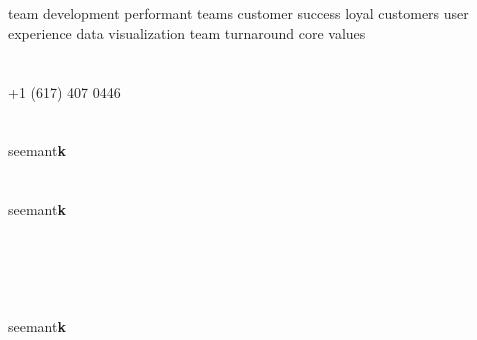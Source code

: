 \documentclass[]{friggeri-cv} %
\newcommand{\rotxc}[1]{\begin{sideways}#1\end{sideways}}
\newcommand{\invert}[1]{\rotxc{\rotxc{#1}}}
\begin{document}
\begin{aside} %
\section{{\scriptsize {}}}
team development
performant teams
customer success
loyal customers
user experience
data visualization
team turnaround
core values
~
~
\section{\href{tel:617.407.0446}{\scriptsize {}}}
+1 (617) 407 0446
~
~
\section{\href{skype:seemantk}{}}
seemant\textbf{k}
~
~
\section{\href{mailto:seemantk@gmail.com}{}}
seemant\textbf{k}
~
~
\section{\href{http://www.github.com/seemantk}{} ~ \href{http://www.twitter.com/seemantk}{} ~ \href{http://www.linkedin.com/in/seemantk}{}}
seemant\textbf{k}
\end{aside}

\end{document}
